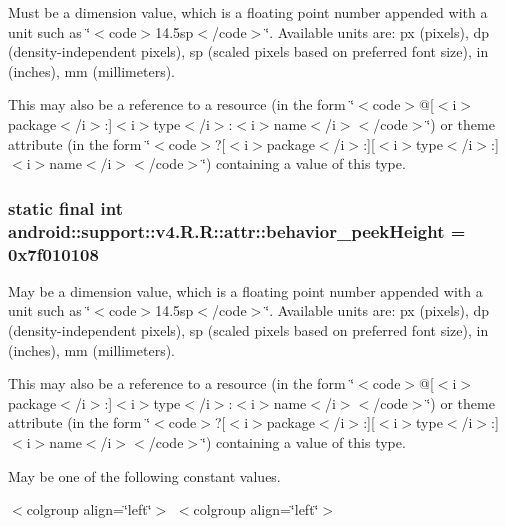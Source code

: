 Must be a dimension value, which is a floating point number appended with a unit such as \char`\"{}$<$code$>$14.5sp$<$/code$>$\char`\"{}. Available units are: px (pixels), dp (density-independent pixels), sp (scaled pixels based on preferred font size), in (inches), mm (millimeters). 

This may also be a reference to a resource (in the form \char`\"{}$<$code$>$@\mbox{[}$<$i$>$package$<$/i$>$:\mbox{]}$<$i$>$type$<$/i$>$:$<$i$>$name$<$/i$>$$<$/code$>$\char`\"{}) or theme attribute (in the form \char`\"{}$<$code$>$?\mbox{[}$<$i$>$package$<$/i$>$:\mbox{]}\mbox{[}$<$i$>$type$<$/i$>$:\mbox{]}$<$i$>$name$<$/i$>$$<$/code$>$\char`\"{}) containing a value of this type. \hypertarget{classandroid_1_1support_1_1v4_1_1_r_1_1attr_a072373bb362000b381bfebbff9a417e}{
\subsubsection[{behavior\_\-peekHeight}]{\setlength{\rightskip}{0pt plus 5cm}static final int android::support::v4.R.R::attr::behavior\_\-peekHeight = 0x7f010108}}
\label{classandroid_1_1support_1_1v4_1_1_r_1_1attr_a072373bb362000b381bfebbff9a417e}


May be a dimension value, which is a floating point number appended with a unit such as \char`\"{}$<$code$>$14.5sp$<$/code$>$\char`\"{}. Available units are: px (pixels), dp (density-independent pixels), sp (scaled pixels based on preferred font size), in (inches), mm (millimeters). 

This may also be a reference to a resource (in the form \char`\"{}$<$code$>$@\mbox{[}$<$i$>$package$<$/i$>$:\mbox{]}$<$i$>$type$<$/i$>$:$<$i$>$name$<$/i$>$$<$/code$>$\char`\"{}) or theme attribute (in the form \char`\"{}$<$code$>$?\mbox{[}$<$i$>$package$<$/i$>$:\mbox{]}\mbox{[}$<$i$>$type$<$/i$>$:\mbox{]}$<$i$>$name$<$/i$>$$<$/code$>$\char`\"{}) containing a value of this type. 

May be one of the following constant values. \begin{TabularC}{0}
\hline
\end{TabularC}
$<$colgroup align=\char`\"{}left\char`\"{}$>$ $<$colgroup align=\char`\"{}left\char`\"{}$>$ 

